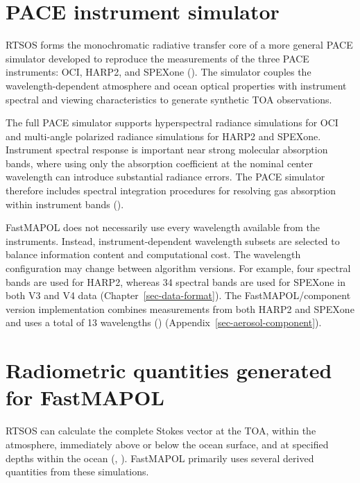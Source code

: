 \documentclass[
  11pt,
  letterpaper,
]{scrreprt}
\begin{document}
\section{PACE instrument simulator}\label{pace-instrument-simulator}

RTSOS forms the monochromatic radiative transfer core of a more general
PACE simulator developed to reproduce the measurements of the three PACE
instruments: OCI, HARP2, and SPEXone (). The simulator couples the wavelength-dependent atmosphere
and ocean optical properties with instrument spectral and viewing
characteristics to generate synthetic TOA observations.

The full PACE simulator supports hyperspectral radiance simulations for
OCI and multi-angle polarized radiance simulations for HARP2 and
SPEXone. Instrument spectral response is important near strong molecular
absorption bands, where using only the absorption coefficient at the
nominal center wavelength can introduce substantial radiance errors. The
PACE simulator therefore includes spectral integration procedures for
resolving gas absorption within instrument bands
().

FastMAPOL does not necessarily use every wavelength available from the
instruments. Instead, instrument-dependent wavelength subsets are
selected to balance information content and computational cost. The
wavelength configuration may change between algorithm versions. For
example, four spectral bands are used for HARP2, whereas 34 spectral
bands are used for SPEXone in both V3 and V4 data
(Chapter~\ref{sec-data-format}). The FastMAPOL/component version
implementation combines measurements from both HARP2 and SPEXone and
uses a total of 13 wavelengths () (Appendix~\ref{sec-aerosol-component}).

\section{Radiometric quantities generated for
FastMAPOL}\label{radiometric-quantities-generated-for-fastmapol}

RTSOS can calculate the complete Stokes vector at the TOA, within the
atmosphere, immediately above or below the ocean surface, and at
specified depths within the ocean (, ). FastMAPOL primarily uses
several derived quantities from these simulations.
\end{document}
